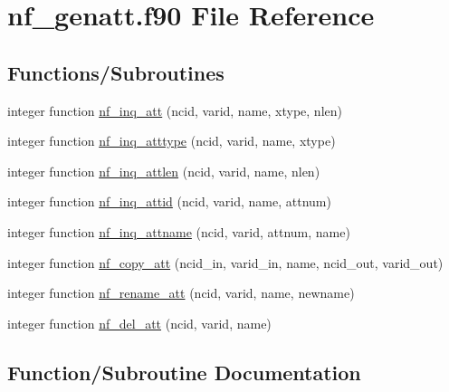 \hypertarget{nf__genatt_8f90}{}\section{nf\+\_\+genatt.\+f90 File Reference}
\label{nf__genatt_8f90}
\subsection*{Functions/\+Subroutines}
\begin{DoxyCompactItemize}
\item 
integer function \hyperlink{nf__genatt_8f90_a56295cef3f86600abb03037771418c4a}{nf\+\_\+inq\+\_\+att} (ncid, varid, name, xtype, nlen)
\item 
integer function \hyperlink{nf__genatt_8f90_a91f4e37ce5ca9dd36e6d04e3c97ea245}{nf\+\_\+inq\+\_\+atttype} (ncid, varid, name, xtype)
\item 
integer function \hyperlink{nf__genatt_8f90_ab080bc8090ac0a28184fdb3abbc860e6}{nf\+\_\+inq\+\_\+attlen} (ncid, varid, name, nlen)
\item 
integer function \hyperlink{nf__genatt_8f90_a34e547f3eea2a17b2ea4d327831e62ca}{nf\+\_\+inq\+\_\+attid} (ncid, varid, name, attnum)
\item 
integer function \hyperlink{nf__genatt_8f90_a87370c5fa098aaf289f0983582387921}{nf\+\_\+inq\+\_\+attname} (ncid, varid, attnum, name)
\item 
integer function \hyperlink{nf__genatt_8f90_a0bc4719840049ac1e8ee3983693642cc}{nf\+\_\+copy\+\_\+att} (ncid\+\_\+in, varid\+\_\+in, name, ncid\+\_\+out, varid\+\_\+out)
\item 
integer function \hyperlink{nf__genatt_8f90_a39b8be3cb9754c08c98f10e0b33efc19}{nf\+\_\+rename\+\_\+att} (ncid, varid, name, newname)
\item 
integer function \hyperlink{nf__genatt_8f90_aac4a8c722320d4d7b0115094ce88db0a}{nf\+\_\+del\+\_\+att} (ncid, varid, name)
\end{DoxyCompactItemize}


\subsection{Function/\+Subroutine Documentation}
\mbox{\label{nf__genatt_8f90_a0bc4719840049ac1e8ee3983693642cc}} 
